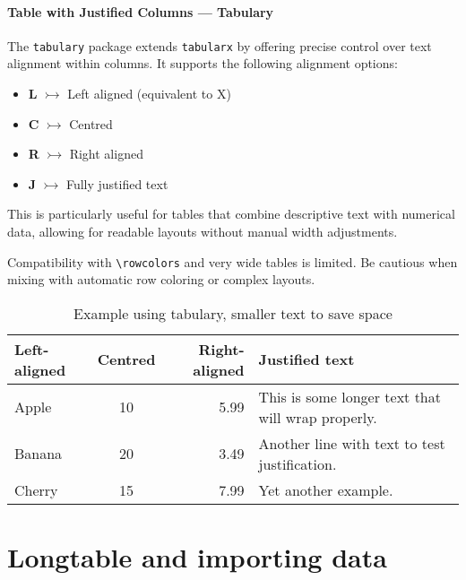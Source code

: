 \paragraph{Table with Justified Columns — Tabulary}
    The \texttt{tabulary} package extends \texttt{tabularx} by offering precise control over text alignment within columns. It supports the following alignment options:

    \begin{itemize}
        \item \textbf{L} $\rightarrowtail$ Left aligned (equivalent to X)
        \item \textbf{C} $\rightarrowtail$ Centred
        \item \textbf{R} $\rightarrowtail$ Right aligned
        \item \textbf{J} $\rightarrowtail$ Fully justified text
    \end{itemize}

    This is particularly useful for tables that combine descriptive text with numerical data, allowing for readable layouts without manual width adjustments.

    \begin{notebox}
        Compatibility with \verb|\rowcolors| and very wide tables is limited. Be cautious when mixing with automatic row coloring or complex layouts.
    \end{notebox}

    \begin{table}[H]
        \centering
        \caption{Example using tabulary, smaller text to save space}
        \small
        \begin{tabulary}{\linewidth}{|L|C|R|J|}
            \hline
            Left-aligned & Centred & Right-aligned & Justified text                                    \\ \hline
            Apple        &    10    &          5.99 & This is some longer text that will wrap properly. \\
            Banana       &    20    &          3.49 & Another line with text to test justification.     \\
            Cherry       &    15    &          7.99 & Yet another example.                              \\ \hline
        \end{tabulary}
    \end{table}

\section{Longtable and importing data}


